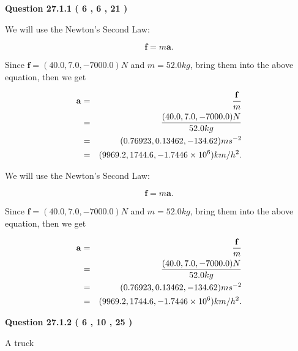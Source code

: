 \documentclass[12pt]{article}
\begin{document}
{\textbf{\Large{Question
27.1.1 
 (           6 ,           6 ,          21 )
}}}
  
  
 
 
\noindent{}

We will use the Newton's Second Law:
 
\[
\mathbf{f}=m\mathbf{a}.
\]
 
Since $\mathbf{f}=( %
40.0,  %
7.0,  %
-7000.0 )N$
and $m= %
52.0 kg$, bring them into the above equation, then we get
 
\begin{eqnarray*}
\mathbf{a}&=&\frac{\mathbf{f}}m  \\
&=&\frac{(
40.0 ,
7.0 ,
-7000.0 )N
}{ %
52.0 kg}  \\
&=&(
0.76923 ,
0.13462,
-134.62
)ms^{-2} \\
&=&(
9969.2 ,
1744.6 ,
-1.7446 \times 10^{6}
)km/h^2.
\end{eqnarray*}
 
 
 
 
 
\noindent{}

We will use the Newton's Second Law:
 
\[
\mathbf{f}=m\mathbf{a}.
\]
 
Since $\mathbf{f}=( %
40.0,  %
7.0,  %
-7000.0 )N$
and $m= %
52.0 kg$, bring them into the above equation, then we get
 
\begin{eqnarray*}
\mathbf{a}&=&\frac{\mathbf{f}}m  \\
&=&\frac{(
40.0 ,
7.0 ,
-7000.0 )N
}{ %
52.0 kg}  \\
&=&(
0.76923 ,
0.13462,
-134.62
)ms^{-2} \\
&=&(
9969.2 ,
1744.6 ,
-1.7446 \times 10^{6}
)km/h^2.
\end{eqnarray*}
 
 
 
  
\vspace{0.2in}
  
{\textbf{\Large{Question
27.1.2 
 (           6 ,          10 ,          25 )
}}}
  
  
 
 
\noindent{}
 
 
A truck
 
\end{document}
